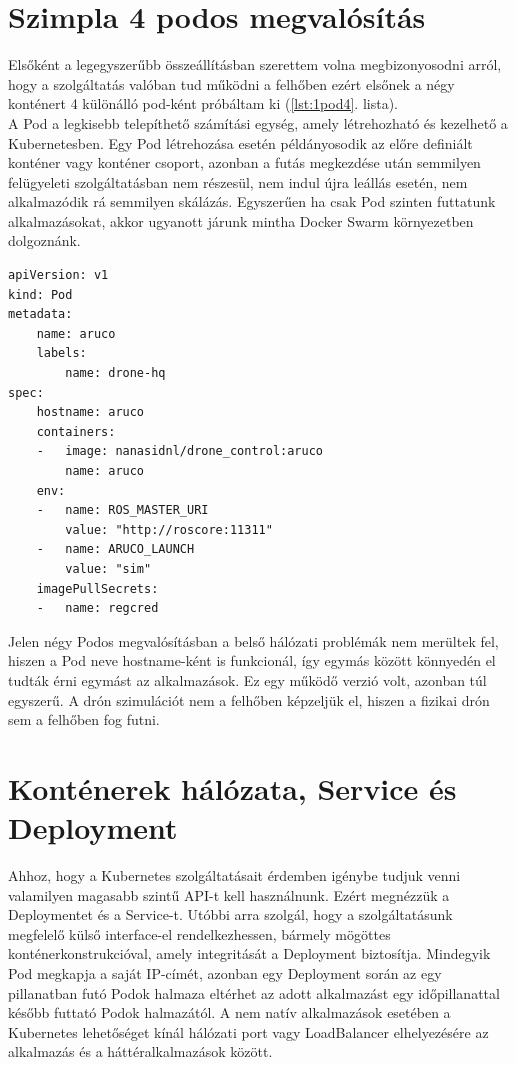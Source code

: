 \section{Szimpla 4 podos megvalósítás}
Elsőként a legegyszerűbb összeállításban szerettem volna megbizonyosodni arról, hogy a szolgáltatás valóban tud működni a felhőben ezért elsőnek a négy konténert 4 különálló pod-ként próbáltam ki (\ref{lst:1pod4}. lista). \\

\noindent
A Pod a legkisebb telepíthető számítási egység, amely létrehozható és kezelhető a Kubernetesben. Egy Pod létrehozása esetén példányosodik az előre definiált konténer vagy konténer csoport, azonban a futás megkezdése után semmilyen felügyeleti szolgáltatásban nem részesül, nem indul újra leállás esetén, nem alkalmazódik rá semmilyen skálázás. Egyszerűen ha csak Pod szinten futtatunk alkalmazásokat, akkor ugyanott járunk mintha Docker Swarm környezetben dolgoznánk. \\
\begin{lstlisting}[caption={Példa egy Pod-ra a négyből},label={lst:1pod4}]
apiVersion: v1
kind: Pod
metadata:
	name: aruco
	labels:
		name: drone-hq
spec:
	hostname: aruco
	containers:
	- 	image: nanasidnl/drone_control:aruco
		name: aruco
	env:
	- 	name: ROS_MASTER_URI
		value: "http://roscore:11311"
	- 	name: ARUCO_LAUNCH
		value: "sim"
	imagePullSecrets:
	-	name: regcred
\end{lstlisting}

\noindent
Jelen négy Podos megvalósításban a belső hálózati problémák nem merültek fel, hiszen a Pod neve hostname-ként is funkcionál, így egymás között könnyedén el tudták érni egymást az alkalmazások. Ez egy működő verzió volt, azonban túl egyszerű. A drón szimulációt nem a felhőben képzeljük el, hiszen a fizikai drón sem a felhőben fog futni.

\section{Konténerek hálózata, Service és Deployment}

Ahhoz, hogy a Kubernetes szolgáltatásait érdemben igénybe tudjuk venni valamilyen magasabb szintű API-t kell használnunk. Ezért megnézzük a Deploymentet és a Service-t. Utóbbi arra szolgál, hogy a szolgáltatásunk megfelelő külső interface-el rendelkezhessen, bármely mögöttes konténerkonstrukcióval, amely integritását a Deployment biztosítja. Mindegyik Pod megkapja a saját IP-címét, azonban egy Deployment során az egy pillanatban futó Podok halmaza eltérhet az adott alkalmazást egy időpillanattal később futtató Podok halmazától. A nem natív alkalmazások esetében a Kubernetes lehetőséget kínál hálózati port vagy LoadBalancer elhelyezésére az alkalmazás és a háttéralkalmazások között. \cite{kservice} \\

